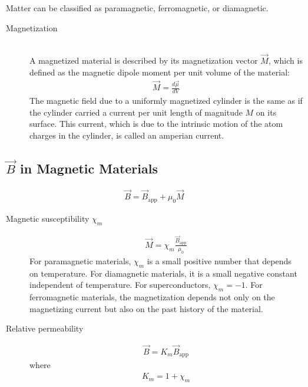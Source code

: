 \documentclass[../main.tex]{subfiles}
\begin{document}
Matter can be classified as paramagnetic, ferromagnetic, or diamagnetic.

\begin{description}
  \item[Magnetization] \hfill \\
    A magnetized material is described by its magnetization vector $\vec{M}$,
    which is defined as the magnetic dipole moment per unit volume of the
    material:
    \begin{align}
      \vec{M} = \frac{d\vec{\mu}}{dV}
    \end{align}
    The magnetic field due to a uniformly magnetized cylinder is the same as if
    the cylinder carried a current per unit length of magnitude $M$ on its
    surface. This current, which is due to the intrinsic motion of the atom
    charges in the cylinder, is called an amperian current.
\end{description}

\subsection{$\vec{B}$ in Magnetic Materials}
\label{sub:_b_in_magentic_materials}

\begin{align}
  \vec{B} = \vec{B}_\text{app} + \mu_0\vec{M}
\end{align}

\begin{description}
  \item[Magnetic susceptibility $\chi_m$]
    \begin{align}
      \vec{M} = \chi_m\frac{\vec{B}_\text{app}}{\mu_0}
    \end{align}
    For paramagnetic materials, $\chi_m$ is a small positive number that
    depends on temperature. For diamagnetic materials, it is a small negative
    constant independent of temperature. For superconductors, $\chi_m = -1$.
    For ferromagnetic materials, the magnetization depends not only on the
    magnetizing current but also on the past history of the material.
  \item[Relative permeability]
    \begin{align}
      \vec{B} = K_m\vec{B}_\text{app}
    \end{align}
    where
    \begin{align}
       K_m = 1 + \chi_m
    \end{align}
\end{description}
\end{document}
